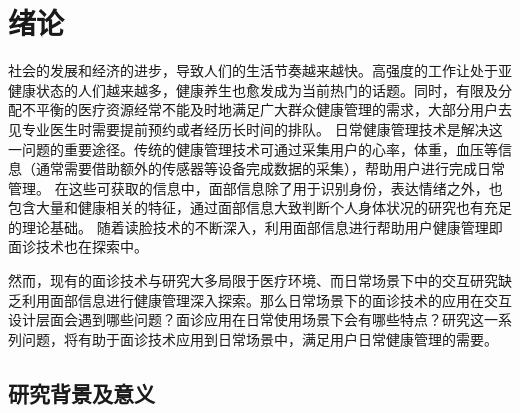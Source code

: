 \chapter{绪论}



社会的发展和经济的进步，导致人们的生活节奏越来越快。高强度的工作让处于亚健康状态的人们越来越多，健康养生也愈发成为当前热门的话题。同时，有限及分配不平衡的医疗资源经常不能及时地满足广大群众健康管理的需求，大部分用户去见专业医生时需要提前预约或者经历长时间的排队\cite{雷鹏中国医疗资源配置与服务利用现状评价}。
日常健康管理技术是解决这一问题的重要途径。传统的健康管理技术可通过采集用户的心率，体重，血压等信息\cite{Liu2014Computerized, Wang2004An, Shu2007Developing}（通常需要借助额外的传感器等设备完成数据的采集），帮助用户进行完成日常管理。
在这些可获取的信息中，面部信息除了用于识别身份，表达情绪之外，也包含大量和健康相关的特征，通过面部信息大致判断个人身体状况的研究也有充足的理论基础\cite{杨淑芳2002伤寒六经辨证初探, Clifford2006Shortliffe}。
随着读脸技术的不断深入，利用面部信息进行帮助用户健康管理即面诊技术也在探索中。


然而，现有的面诊技术与研究大多局限于医疗环境、而日常场景下中的交互研究缺乏利用面部信息进行健康管理深入探索。那么日常场景下的面诊技术的应用在交互设计层面会遇到哪些问题？面诊应用在日常使用场景下会有哪些特点？研究这一系列问题，将有助于面诊技术应用到日常场景中，满足用户日常健康管理的需要。


\section{研究背景及意义}

